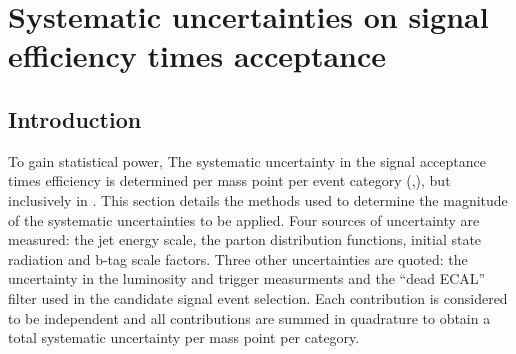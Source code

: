 %

\clearpage
\section{Systematic uncertainties on signal efficiency times 
  acceptance\label{sec:sms-syst}}

\subsection{Introduction} 

To gain statistical power, The systematic uncertainty in the signal 
acceptance times efficiency is determined per mass point per event 
category (\njet,\nb), but inclusively in \scalht . This section details the methods 
used to determine the magnitude of the systematic uncertainties to be applied. 
Four sources of uncertainty are measured: the jet energy scale,
the parton distribution functions, initial state radiation and b-tag scale
factors. Three other uncertainties are quoted: the uncertainty in the luminosity and
trigger measurments and the ``dead ECAL'' filter used in the candidate signal
event selection. Each contribution is considered to be independent 
and all contributions are summed in quadrature to obtain a total 
systematic uncertainty per mass point per category.

